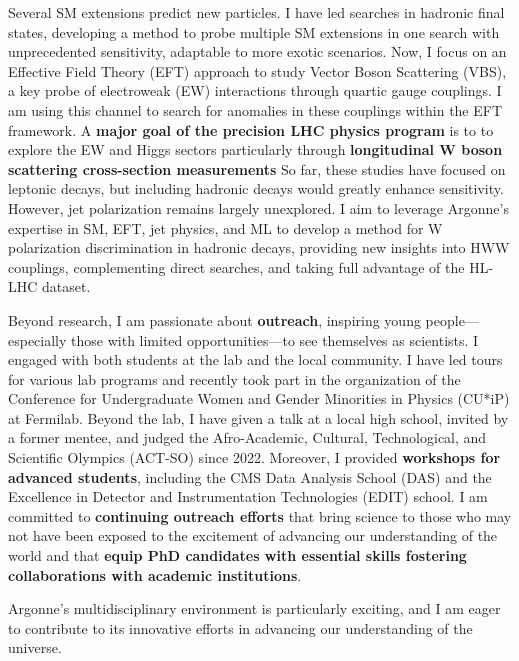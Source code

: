 {\begin{flushleft}
Several SM extensions predict new particles. I have led searches in hadronic final states, developing a method to probe multiple SM extensions in one search with unprecedented sensitivity, adaptable to more exotic scenarios. Now, I focus on an Effective Field Theory (EFT) approach to study Vector Boson Scattering (VBS), a key probe of electroweak (EW) interactions through quartic gauge couplings. I am using this channel to search for anomalies in these couplings within the EFT framework. 
A {\bf major goal of the precision LHC physics program} is to to explore the EW and Higgs sectors particularly through {\bf longitudinal W boson scattering cross-section measurements}  So far, these studies have focused on leptonic decays, but including hadronic decays would greatly enhance sensitivity. However, jet polarization remains largely unexplored. I aim to leverage Argonne’s expertise in SM, EFT, jet physics, and ML to develop a method for W polarization discrimination in hadronic decays, providing new insights into HWW couplings, complementing direct searches, and taking full advantage of the HL-LHC dataset.

Beyond research, I am passionate about {\bf outreach}, inspiring young people—especially those with limited opportunities—to see themselves as scientists. I engaged with both students at the lab and the local community. I have led tours for various lab programs and recently took part in the organization of the Conference for Undergraduate Women and Gender Minorities in Physics (CU*iP) at Fermilab. Beyond the lab, I have given a talk at a local high school, invited by a former mentee, and judged the Afro-Academic, Cultural, Technological, and Scientific Olympics (ACT-SO) since 2022. Moreover, I provided {\bf workshops for advanced students}, including the CMS Data Analysis School (DAS) and the Excellence in Detector and Instrumentation Technologies (EDIT) school. I am committed to {\bf continuing outreach efforts} that bring science to those who may not have been exposed to the excitement of advancing our understanding of the world and that {\bf equip PhD candidates with essential skills fostering collaborations with academic institutions}.

Argonne’s multidisciplinary environment is particularly exciting, and I am eager to contribute to its innovative efforts in advancing our understanding of the universe.



\end{flushleft}}
